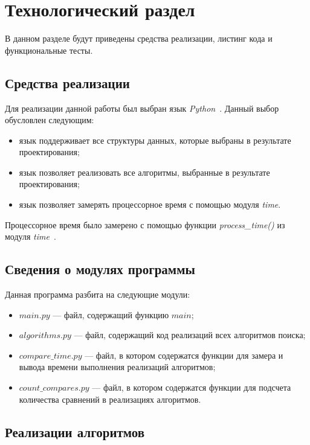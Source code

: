\chapter{Технологический раздел}

В данном разделе будут приведены средства реализации, листинг кода и функциональные тесты.


\section{Средства реализации}

Для реализации данной работы был выбран язык \textit{Python}~\cite{python}.
Данный выбор обусловлен следующим:
\begin{itemize}
	\item язык поддерживает все структуры данных, которые выбраны в результате проектирования;
	\item язык позволяет реализовать все алгоритмы, выбранные в результате проектирования;
	\item язык позволяет замерять процессорное время с помощью модуля \textit{time}. 
\end{itemize}

Процессорное время было замерено с помощью функции \textit{process\_time()} из модуля \textit{time}~\cite{python-time}.

\section{Сведения о модулях программы}

Данная программа разбита на следующие модули:
\begin{itemize}
	\item $main.py$ --- файл, содержащий функцию $main$;
	\item $algorithms.py$ --- файл, содержащий код реализаций всех алгоритмов поиска;
	\item $compare\_time.py$ --- файл, в котором содержатся функции для замера и вывода времени выполнения реализаций алгоритмов;
	\item $count\_compares.py$ --- файл, в котором содержатся функции для подсчета количества сравнений в реализациях алгоритмов.
\end{itemize}

\section{Реализации алгоритмов}

